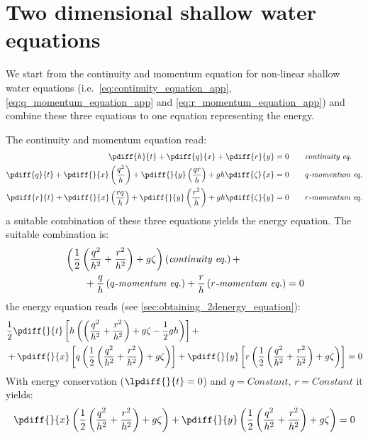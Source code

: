 \section{Two dimensional shallow water equations}\label{sec:err_2dimensional}
We start from the continuity and momentum equation for non-linear shallow water equations (i.e.\ \autoref{eq:continuity_equation_app}, \eqref{eq:q_momentum_equation_app} and \eqref{eq:r_momentum_equation_app}) and combine these three equations to one equation representing the energy.

The continuity and momentum equation read:
\begin{align}
    \pdiff{h}{t}  + \pdiff{q}{x} + \pdiff{r}{y} & = 0 \qquad \textit{continuity eq.} \label{eq:continuity_equation_app}
    \\
    \pdiff{q}{t}  + \pdiff{}{x} \left( \frac{q^2}{h} \right) + \pdiff{}{y} \left( \frac{qr}{h} \right) + g h \pdiff{\zeta}{x} & = 0 \qquad \textit{$q$-momentum eq.}
    \label{eq:q_momentum_equation_app}
    \\
    \pdiff{r}{t}  + \pdiff{}{x} \left( \frac{rq}{h} \right) + \pdiff{}{y} \left( \frac{r^2}{h} \right) + g h \pdiff{\zeta}{y} & = 0 \qquad \textit{$r$-momentum eq.}
    \label{eq:r_momentum_equation_app}
\end{align}
a suitable combination of these three equations yields the energy equation.
The suitable combination is:
\begin{align}
    &\left( \frac{1}{2} \left( \frac{q^2}{h^2} + \frac{r^2}{h^2} \right)+ g \zeta  \right) \left(\textit{continuity eq.}\right)
    +
    \nonumber \\*
    &\qquad
    + \frac{q}{h} \left( \textit{$q$-momentum eq.} \right)
    + \frac{r}{h} \left( \textit{$r$-momentum eq.} \right)
    = 0
    \label{eq:obtaining_2denergy_equation}
\end{align}
the energy equation reads (see \autoref{sec:obtaining_2denergy_equation}):
\begin{align}
    &  \half \pdiff{}{t} \left[ h \left( \left( \frac{q^2}{h^2} + \frac{r^2}{h^2} \right) + g\zeta -\half gh \right)
    \right] +
    \\*
    &
    + \pdiff{}{x} \left[
    q \left( \half \left( \frac{q^2}{h^2}  + \frac{r^2}{h^2}  \right)
    + g \zeta \right)
    \right]
    + \pdiff{}{y} \left[
    r \left( \half \left( \frac{q^2}{h^2} + \frac{r^2}{h^2} \right)
    + g \zeta \right)
    \right] = 0
\end{align}
With energy conservation  ($\lpdiff{}{t}=0$) and $q = \textit{Constant}$, $r = \textit{Constant}$ it yields:
\begin{align}
    \pdiff{}{x}
    \left( \half \left( \frac{q^2}{h^2}  + \frac{r^2}{h^2}  \right)
    + g \zeta \right)
    + \pdiff{}{y}
    \left( \half \left( \frac{q^2}{h^2} + \frac{r^2}{h^2} \right)
    + g \zeta \right) = 0
\end{align}
